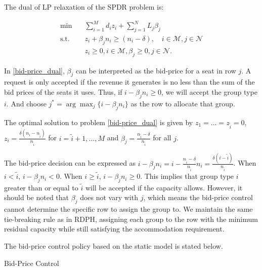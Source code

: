 The dual of LP relaxation of the SPDR problem is:

\begin{equation}\label{bid-price_dual}
  \begin{aligned}
  \min \quad & \sum_{i=1}^{M} d_i z_i + \sum_{j= 1}^{N} L_j \beta_{j} \\
  \text {s.t.} \quad & z_{i} + \beta_j n_i \geq (n_i-\delta), \quad i \in \mathcal{M}, j \in \mathcal{N} \\
  & z_{i} \geq 0, i \in \mathcal{M}, \beta_{j} \geq 0, j \in \mathcal{N}.
  \end{aligned}
\end{equation}

In \eqref{bid-price_dual}, $\beta_{j}$ can be interpreted as the bid-price for a seat in row $j$. A request is only accepted if the revenue it generates is no less than the sum of the bid prices of the seats it uses. Thus, if $i -\beta_{j} n_i \geq 0$, we will accept the group type $i$. And choose $j^{*} = \arg \max_{j} \{i -\beta_{j} n_i\}$ as the row to allocate that group.


\begin{lem}\label{bid-price}
 The optimal solution to problem \eqref{bid-price_dual} is given by $z_1 = \ldots = z_{\tilde{i}} =0$, $z_{i} = \frac{\delta(n_i-n_{\tilde{i}})}{n_{\tilde{i}}}$ for $i = \tilde{i}+1, \ldots, M$ and $\beta_j = \frac{n_{\tilde{i}} - \delta}{n_{\tilde{i}}}$ for all $j$.
\end{lem}

The bid-price decision can be expressed as $i - \beta_j n_i = i - \frac{n_{\tilde{i}} - \delta}{n_{\tilde{i}}} n_i = \frac{\delta (i - \tilde{i})}{n_{\tilde{i}}}$. When $i < \tilde{i}$, $i - \beta_j n_i < 0$. When $i \geq \tilde{i}$, $i - \beta_j n_i \geq 0$. This implies that group type $i$ greater than or equal to $\tilde{i}$ will be accepted if the capacity allows. However, it should be noted that $\beta_j$ does not vary with $j$, which means the bid-price control cannot determine the specific row to assign the group to. We maintain the same tie-breaking rule as in RDPH, assigning each group to the row with the minimum residual capacity while still satisfying the accommodation requirement.


The bid-price control policy based on the static model is stated below.

\begin{algorithm}[H]
  \caption{Bid-Price Control}\label{algo_bid}
\end{algorithm}


